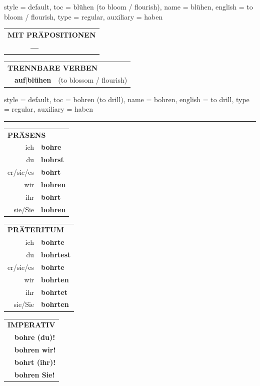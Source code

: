 \begin{verbentry}{
  style = {default},
  toc = {blühen (to bloom / flourish)},
  name = {blühen},
  english = {to bloom / flourish},
  type = {regular},
  auxiliary = {haben}
}
\vspace{10pt}

\begin{tabular}{lll}
\multicolumn{3}{l}{\textbf{MIT PRÄPOSITIONEN}}\\
& \textbf{---} & \\
\end{tabular}
\hfill
\begin{tabular}{lll}
\multicolumn{3}{l}{\textbf{TRENNBARE VERBEN}}\\
& \textbf{auf$|$blühen} & (to blossom / flourish)\\
\end{tabular}
\vspace{-5pt}
\end{verbentry}

\begin{verbentry}{
  style = {default},
  toc = {bohren (to drill)},
  name = {bohren},
  english = {to drill},
  type = {regular},
  auxiliary = {haben}
}


\vspace{5pt}
\hrule
\vspace{5pt}

\begin{tabular}{rl}
\multicolumn{2}{l}{\textbf{PRÄSENS}}\\
ich & \textbf{bohre}\\
du & \textbf{bohrst}\\
er/sie/es & \textbf{bohrt}\\
wir & \textbf{bohren}\\
ihr & \textbf{bohrt}\\
sie/Sie & \textbf{bohren}\\
\end{tabular}
\hfill
\begin{tabular}{rl}
\multicolumn{2}{l}{\textbf{PRÄTERITUM}}\\
ich & \textbf{bohrte}\\
du & \textbf{bohrtest}\\
er/sie/es & \textbf{bohrte}\\
wir & \textbf{bohrten}\\
ihr & \textbf{bohrtet}\\
sie/Sie & \textbf{bohrten}\\
\end{tabular}
\hfill
\begin{tabular}{rl}
\multicolumn{2}{l}{\textbf{IMPERATIV}}\\
& \textbf{bohre (du)!}\\
& \textbf{bohren wir!}\\
& \textbf{bohrt (ihr)!}\\
& \textbf{bohren Sie!}\\
\end{tabular}


\end{verbentry}
